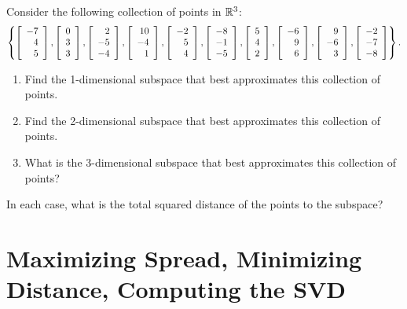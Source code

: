 \documentclass{ximera}
\begin{document}
\begin{example}\label{ex:subspace-fitting-r3}
  Consider the following collection of points in $\R^3$:
  \begin{equation*}
    \set{
      \startmat{r} -7 \\ 4 \\ 5 \stopmat,
      \startmat{r} 0 \\ 3 \\ 3 \stopmat,
      \startmat{r} 2 \\ -5 \\ -4 \stopmat,
      \startmat{r} 10 \\ -4 \\ 1 \stopmat,
      \startmat{r} -2 \\ 5 \\ 4 \stopmat,
      \startmat{r} -8 \\ -1 \\ -5 \stopmat,
      \startmat{r} 5 \\ 4 \\ 2 \stopmat,
      \startmat{r} -6 \\ 9 \\ 6 \stopmat,
      \startmat{r} 9 \\ -6 \\ 3 \stopmat,
      \startmat{r} -2 \\ -7 \\ -8 \stopmat
    }.
  \end{equation*}
    \begin{enumerate}
    \item Find the 1-dimensional subspace that best approximates this
      collection of points.
    \item Find the 2-dimensional subspace that best approximates this
      collection of points.
    \item What is the 3-dimensional subspace that best approximates this
      collection of points?
    \end{enumerate}
  In each case, what is the total squared distance of the points to
  the subspace?
\end{example}



\section*{Maximizing Spread, Minimizing Distance, Computing the SVD}
\end{document}
